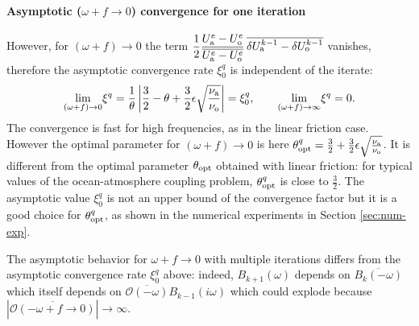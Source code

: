 \paragraph{Asymptotic ($\omega+f \rightarrow 0$) convergence for
	one iteration}
However, for $(\omega+f) \rightarrow 0$ the term 
$\displaystyle \frac{1}{2}\frac{U_{\rm a}^e - U_{\rm o}^e}{\overline{U_{\rm a}^e - U_{\rm o}^e}}\,
\overline{
\delta U_{\rm a}^{k-1} - \delta U_{\rm o}^{k-1}}$
vanishes, therefore the asymptotic convergence 
rate $\xi_0^q$ is independent of the iterate:
\[
 \underset{(\omega+f) \rightarrow 0}{\mathrm{lim}} \xi^q = \frac{1}{\theta} \left| \frac{3}{2}-\theta+\frac{3}{2}\epsilon\sqrt{\frac{\nu_{\rm a}}{\nu_{\rm o}}} \right| = \xi_0^q, \qquad
 \underset{(\omega+f) \rightarrow \infty}{\mathrm{lim}} \xi^q = 0.
\]
The convergence is fast for high frequencies,
as in the linear friction case. However
the optimal parameter for $(\omega+f) \rightarrow 0$ is
here $\theta_{\rm opt}^q = \frac{3}{2} +
\frac{3}{2}\epsilon\sqrt{\frac{\nu_{\rm a}}{\nu_{\rm o}}}$.
It is different from the optimal parameter $\theta_{\rm opt}$
obtained with linear friction: for typical values of the
ocean-atmosphere coupling problem, $\theta_{\rm opt}^q$
is close to $\frac{3}{2}$.
The asymptotic value $\xi_0^q$ is not an upper bound of the
convergence factor but it is a good choice for $\theta_{\rm opt}^q$,
as shown in the numerical experiments in Section \ref{sec:num-exp}.
\par
The asymptotic behavior for $\omega+f \rightarrow 0$ with
multiple iterations differs from the asymptotic convergence
rate $\xi_0^q$ above:
indeed, $B_{k+1}(\omega)$ depends on
$\overline{B_k(- \omega)}$ which itself depends on
$\overline{\mathcal{O}(-\omega)} B_{k-1}(i\omega)$
which could explode because
$|\overline{\mathcal{O}(-\omega+ f \rightarrow 0)}|
\rightarrow \infty$.
